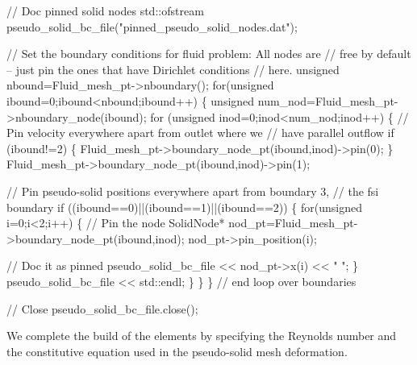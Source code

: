 \begin{DoxyCodeInclude}
 
 \textcolor{comment}{// Doc pinned solid nodes}
 std::ofstream pseudo\_solid\_bc\_file(\textcolor{stringliteral}{"pinned\_pseudo\_solid\_nodes.dat"});

 \textcolor{comment}{// Set the boundary conditions for fluid problem: All nodes are}
 \textcolor{comment}{// free by default -- just pin the ones that have Dirichlet conditions}
 \textcolor{comment}{// here. }
 \textcolor{keywordtype}{unsigned} nbound=Fluid\_mesh\_pt->nboundary();
 \textcolor{keywordflow}{for}(\textcolor{keywordtype}{unsigned} ibound=0;ibound<nbound;ibound++)
  \{
   \textcolor{keywordtype}{unsigned} num\_nod=Fluid\_mesh\_pt->nboundary\_node(ibound);
   \textcolor{keywordflow}{for} (\textcolor{keywordtype}{unsigned} inod=0;inod<num\_nod;inod++)
    \{
     \textcolor{comment}{// Pin velocity everywhere apart from outlet where we}
     \textcolor{comment}{// have parallel outflow}
     \textcolor{keywordflow}{if} (ibound!=2)
      \{
       Fluid\_mesh\_pt->boundary\_node\_pt(ibound,inod)->pin(0); 
      \}
     Fluid\_mesh\_pt->boundary\_node\_pt(ibound,inod)->pin(1); 

     \textcolor{comment}{// Pin pseudo-solid positions everywhere apart from boundary 3, }
     \textcolor{comment}{// the fsi boundary }
     \textcolor{keywordflow}{if} ((ibound==0)||(ibound==1)||(ibound==2))
      \{
       \textcolor{keywordflow}{for}(\textcolor{keywordtype}{unsigned} i=0;i<2;i++)
        \{
         \textcolor{comment}{// Pin the node}
         SolidNode* nod\_pt=Fluid\_mesh\_pt->boundary\_node\_pt(ibound,inod);
         nod\_pt->pin\_position(i);

         \textcolor{comment}{// Doc it as pinned}
         pseudo\_solid\_bc\_file << nod\_pt->x(i) << \textcolor{stringliteral}{" "};
        \}
       pseudo\_solid\_bc\_file << std::endl;
      \}
    \}
  \} \textcolor{comment}{// end loop over boundaries}

 \textcolor{comment}{// Close}
 pseudo\_solid\_bc\_file.close();

\end{DoxyCodeInclude}


We complete the build of the elements by specifying the Reynolds number and the constitutive equation used in the pseudo-\/solid mesh deformation.


